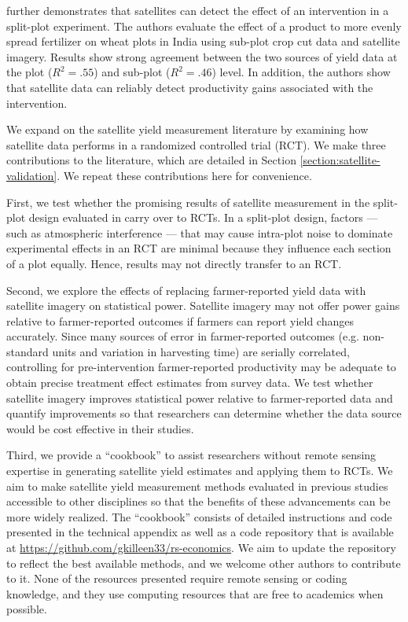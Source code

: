 \documentclass{article}
\begin{document}
\citet{Jain2019TheData} further demonstrates that satellites can detect the effect of an intervention in a split-plot experiment. The authors evaluate the effect of a product to more evenly spread fertilizer on wheat plots in India using sub-plot crop cut data and satellite imagery. Results show strong agreement between the two sources of yield data at the plot ($R^2=.55$) and sub-plot ($R^2=.46$) level. In addition, the authors show that satellite data can reliably detect productivity gains associated with the intervention. 

We expand on the satellite yield measurement literature by examining how satellite data performs in a randomized controlled trial (RCT). We make three contributions to the literature, which are detailed in Section \ref{section:satellite-validation}. We repeat these contributions here for convenience.  

First, we test whether the promising results of satellite measurement in the split-plot design evaluated in \citet{Jain2019TheData} carry over to RCTs. In a split-plot design, factors — such as atmospheric interference — that may cause intra-plot noise to dominate experimental effects in an RCT are minimal because they influence each section of a plot equally. Hence, results may not directly transfer to an RCT. 

Second, we explore the effects of replacing farmer-reported yield data with satellite imagery on statistical power. Satellite imagery may not offer power gains relative to farmer-reported outcomes if farmers can report yield changes accurately. Since many sources of error in farmer-reported outcomes (e.g. non-standard units and variation in harvesting time) are serially correlated, controlling for pre-intervention farmer-reported productivity may be adequate to obtain precise treatment effect estimates from survey data. We test whether satellite imagery improves statistical power relative to farmer-reported data and quantify improvements so that researchers can determine whether the data source would be cost effective in their studies. 

Third, we provide a ``cookbook'' to assist researchers without remote sensing expertise in generating satellite yield estimates and applying them to RCTs. We aim to make satellite yield measurement methods evaluated in previous studies accessible to other disciplines so that the benefits of these advancements can be more widely realized. The “cookbook” consists of detailed instructions and code presented in the technical appendix as well as a code repository that is available at \url{https://github.com/gkilleen33/rs-economics}. We aim to update the repository to reflect the best available methods, and we welcome other authors to contribute to it. None of the resources presented require remote sensing or coding knowledge, and they use computing resources that are free to academics when possible. 
\end{document}
